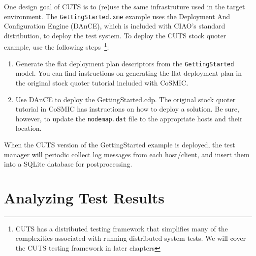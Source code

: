 One design goal of CUTS is to (re)use the same infrastruture used in the 
target environment. The \texttt{GettingStarted.xme} example uses the Deployment 
And Configuration Engine (DAnCE), which is included with CIAO's standard 
distribution, to deploy the test system. To deploy the CUTS stock quoter 
example, use the following steps~\footnote{CUTS has a distributed testing
framework that simplifies many of the complexities associated with running
distributed system tests. We will cover the CUTS testing framework in later
chapters}:
\begin{enumerate}
  \item Generate the flat deployment plan descriptors from the 
  \texttt{GettingStarted}  model. You can find instructions on generating 
  the flat deployment plan in the original stock quoter tutorial included 
  with CoSMIC.
  
  \item Use DAnCE to deploy the GettingStarted.cdp. The original stock 
  quoter tutorial in CoSMIC has instructions on how to deploy a solution. 
  Be sure, however, to update the \texttt{nodemap.dat} file to the appropriate
  hosts and their location.
\end{enumerate}
When the CUTS version of the GettingStarted example is deployed, the test
manager will periodic collect log messages from each host/\-client, and 
insert them into a SQLite database for postprocessing.

\section{Analyzing Test Results}
\label{sec:quickstart-analysis}
